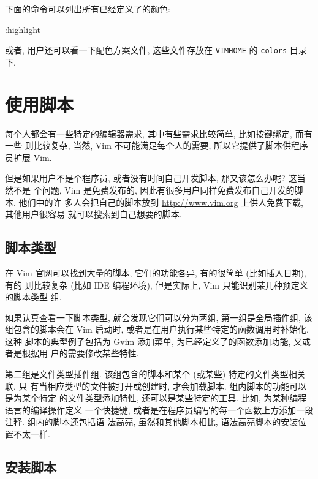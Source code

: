 下面的命令可以列出所有已经定义了的颜色:
\begin{vimcode}
:highlight
\end{vimcode}

\begin{warning}
    或者, 用户还可以看一下配色方案文件, 这些文件存放在 \texttt{VIMHOME} 的
    \texttt{colors} 目录下.
\end{warning}

\section{使用脚本}
\label{sec:using_scripts}

每个人都会有一些特定的编辑器需求, 其中有些需求比较简单, 比如按键绑定, 而有一些
则比较复杂, 当然, Vim 不可能满足每个人的需要, 所以它提供了脚本供程序员扩展
Vim.

但是如果用户不是个程序员, 或者没有时间自己开发脚本, 那又该怎么办呢? 这当然不是
个问题, Vim 是免费发布的, 因此有很多用户同样免费发布自己开发的脚本. 他们中的许
多人会把自己的脚本放到 \url{http://www.vim.org} 上供人免费下载, 其他用户很容易
就可以搜索到自己想要的脚本.

\subsection{脚本类型}
\label{subsec:script_types}

在 Vim 官网可以找到大量的脚本, 它们的功能各异, 有的很简单 (比如插入日期), 有的
则比较复杂 (比如 IDE 编程环境), 但是实际上, Vim 只能识别某几种预定义的脚本类型
组.

如果认真查看一下脚本类型, 就会发现它们可以分为两组, 第一组是全局插件组, 该
组包含的脚本会在 Vim 启动时, 或者是在用户执行某些特定的函数调用时补始化. 这种
脚本的典型例子包括为 Gvim 添加菜单, 为已经定义了的函数添加功能, 又或者是根据用
户的需要修改某些特性.

第二组是文件类型插件组. 该组包含的脚本和某个 (或某些) 特定的文件类型相关联, 只
有当相应类型的文件被打开或创建时, 才会加载脚本. 组内脚本的功能可以是为某个特定
的文件类型添加特性, 还可以是某些特定的工具. 比如, 为某种编程语言的编译操作定义
一个快捷键, 或者是在程序员编写的每一个函数上方添加一段注释. 组内的脚本还包括语
法高亮, 虽然和其他脚本相比, 语法高亮脚本的安装位置不太一样.

\subsection{安装脚本}
\label{subsec:installing_scripts}

